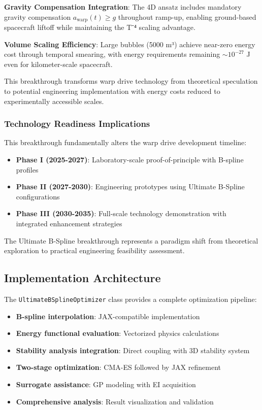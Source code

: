 \documentclass[11pt]{article}
\begin{document}
\textbf{Gravity Compensation Integration}:
The 4D ansatz includes mandatory gravity compensation $a_{\text{warp}}(t) \geq g$ throughout ramp-up, enabling ground-based spacecraft liftoff while maintaining the T⁻⁴ scaling advantage.

\textbf{Volume Scaling Efficiency}:
Large bubbles (5000 m³) achieve near-zero energy cost through temporal smearing, with energy requirements remaining $\sim 10^{-27}$ J even for kilometer-scale spacecraft.

This breakthrough transforms warp drive technology from theoretical speculation to potential engineering implementation with energy costs reduced to experimentally accessible scales.

\subsubsection{Technology Readiness Implications}

This breakthrough fundamentally alters the warp drive development timeline:

\begin{itemize}
\item \textbf{Phase I (2025-2027)}: Laboratory-scale proof-of-principle with B-spline profiles
\item \textbf{Phase II (2027-2030)}: Engineering prototypes using Ultimate B-Spline configurations  
\item \textbf{Phase III (2030-2035)}: Full-scale technology demonstration with integrated enhancement strategies
\end{itemize}

The Ultimate B-Spline breakthrough represents a paradigm shift from theoretical exploration to practical engineering feasibility assessment.

\subsection{Implementation Architecture}

The \texttt{UltimateBSplineOptimizer} class provides a complete optimization pipeline:

\begin{itemize}
\item \textbf{B-spline interpolation}: JAX-compatible implementation
\item \textbf{Energy functional evaluation}: Vectorized physics calculations
\item \textbf{Stability analysis integration}: Direct coupling with 3D stability system
\item \textbf{Two-stage optimization}: CMA-ES followed by JAX refinement
\item \textbf{Surrogate assistance}: GP modeling with EI acquisition
\item \textbf{Comprehensive analysis}: Result visualization and validation
\end{itemize}
\end{document}
